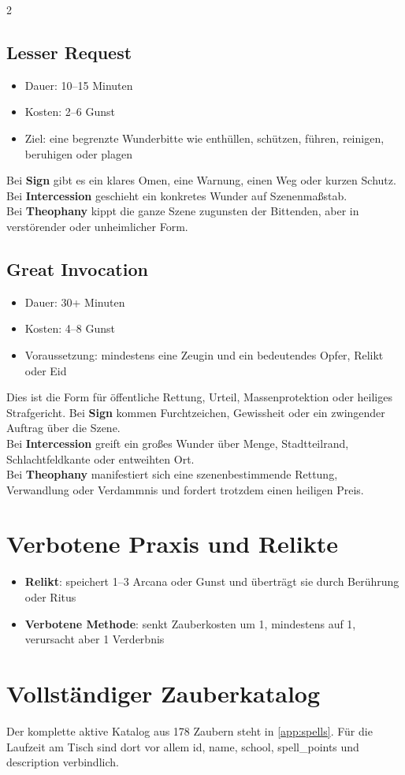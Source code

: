 \begin{multicols*}{2}
\subsection{Lesser Request}
\begin{itemize}[leftmargin=*]
\item Dauer: 10--15 Minuten
\item Kosten: 2--6 Gunst
\item Ziel: eine begrenzte Wunderbitte wie enthüllen, schützen, führen, reinigen, beruhigen oder plagen
\end{itemize}
Bei \textbf{Sign} gibt es ein klares Omen, eine Warnung, einen Weg oder kurzen Schutz.\\
Bei \textbf{Intercession} geschieht ein konkretes Wunder auf Szenenmaßstab.\\
Bei \textbf{Theophany} kippt die ganze Szene zugunsten der Bittenden, aber in verstörender oder unheimlicher Form.

\subsection{Great Invocation}
\begin{itemize}[leftmargin=*]
\item Dauer: 30+ Minuten
\item Kosten: 4--8 Gunst
\item Voraussetzung: mindestens eine Zeugin und ein bedeutendes Opfer, Relikt oder Eid
\end{itemize}
Dies ist die Form für öffentliche Rettung, Urteil, Massenprotektion oder heiliges Strafgericht.
Bei \textbf{Sign} kommen Furchtzeichen, Gewissheit oder ein zwingender Auftrag über die Szene.\\
Bei \textbf{Intercession} greift ein großes Wunder über Menge, Stadtteilrand, Schlachtfeldkante oder entweihten Ort.\\
Bei \textbf{Theophany} manifestiert sich eine szenenbestimmende Rettung, Verwandlung oder Verdammnis und fordert trotzdem einen heiligen Preis.

\section{Verbotene Praxis und Relikte}
\begin{itemize}[leftmargin=*]
\item \textbf{Relikt}: speichert 1--3 Arcana oder Gunst und überträgt sie durch Berührung oder Ritus
\item \textbf{Verbotene Methode}: senkt Zauberkosten um 1, mindestens auf 1, verursacht aber 1 Verderbnis
\end{itemize}

\section{Vollständiger Zauberkatalog}
Der komplette aktive Katalog aus 178 Zaubern steht in \cref{app:spells}. Für die Laufzeit am Tisch sind dort vor allem id, name, school, spell\_points und description verbindlich.
\end{multicols*}
